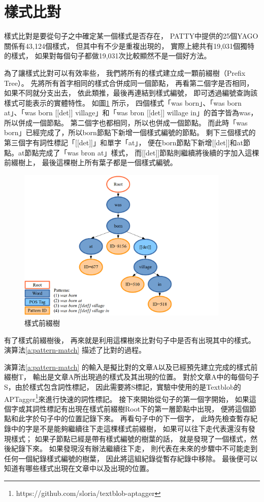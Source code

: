 \section{樣式比對}
\label{s:pattern-match}

樣式比對是要從句子之中確定某一個樣式是否存在，
PATTY中提供的25個YAGO關係有43,124個樣式，
但其中有不少是重複出現的，
實際上總共有19,031個獨特的樣式，
如果對每個句子都做19,031次比較顯然不是一個好方法。

為了讓樣式比對可以有效率些，
我們將所有的樣式建立成一顆前綴樹（Prefix Tree）。
先將所有首字相同的樣式合併成同一個節點，
再看第二個字是否相同，如果不同就分支出去，
依此類推，最後再連結到樣式編號，
即可透過編號查詢該樣式可能表示的實體特性。
如圖\ref{i:pattern-prefix-tree} 所示，
四個樣式「was born」、「was born at」、「was born [[det]] village」和「was bron [[det]] willage in」的首字皆為was，所以併成一個節點。
第二個字也都相同，所以也併成一個節點。
而此時「was born」已經完成了，所以born節點下新增一個樣式編號的節點。
剩下三個樣式的第三個字有詞性標記「[[det]]」和單字「at」，
便在born節點下新增[[det]]和at節點。at節點完成了「was bron at」樣式，
而[[det]]節點則繼續將後續的字加入這棵前綴樹上，
最後這棵樹上所有葉子都是一個樣式編號。

\begin{figure}
    \centering
    \includegraphics[width=0.9\textwidth]{images/03-pattern-prefix-tree}
    \caption{樣式前綴樹}
    \label{i:pattern-prefix-tree}
\end{figure}

有了樣式前綴樹後，
再來就是利用這棵樹來比對句子中是否有出現其中的樣式。
演算法\ref{a:pattern-match} 描述了比對的過程。

演算法\ref{a:pattern-match} 的輸入是擬比對的文章A以及已經預先建立完成的樣式前綴樹T，
輸出是文章A所出現過的樣式及其出現的位置。
對於文章A中的每個句子S，由於樣式包含詞性標記，
因此需要將S標記，實驗中使用的是Textblob的APTagger\footnote{https://github.com/sloria/textblob-aptagger}來進行快速的詞性標記。
接下來開始從句子的第一個字開始，
如果這個字或其詞性標記有出現在樣式前綴樹Root下的第一層節點中出現，
便將這個節點和此字於句子中的位置記錄下來。
再看句子中的下一個字，
此時先檢查暫存紀錄中的字是不是能夠繼續往下走這棵樣式前綴樹，
如果可以往下走代表還沒有發現樣式；
如果子節點已經是帶有樣式編號的樹葉的話，
就是發現了一個樣式，然後紀錄下來。
如果發現沒有辦法繼續往下走，
則代表在未來的步驟中不可能走到任何一個紀錄樣式編號的樹葉，
因此將這組紀錄從暫存紀錄中移除。
最後便可以知道有哪些樣式出現在文章中以及出現的位置。

